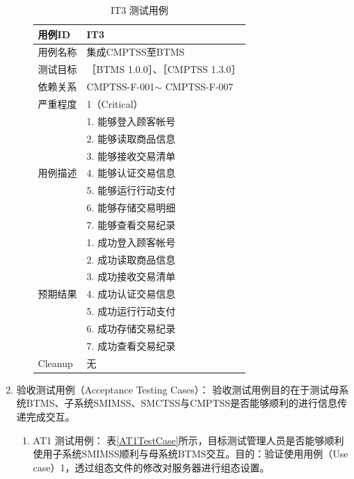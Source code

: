 \begin{enumerate}
\begin{enumerate}
						\begin{table}[!htbp]
						\caption{IT3 测试用例} %
						\centering %
						\label{IT3TestCase} %
						\begin{tabular}{|l|l|}
						\hline
						用例ID & IT3 \\ \hline
						用例名称 & 集成CMPTSS至BTMS \\ \hline
						测试目标 & {［}BTMS 1.0.0{］}、{［}CMPTSS 1.3.0{］} \\ \hline
						依赖关系 & CMPTSS-F-001$\sim$ CMPTSS-F-007 \\ \hline
						严重程度 & 1（Critical） \\ \hline
						\multirow{7}{*}{用例描述} & 1.     能够登入顾客帐号 \\ \cline{2-2} 
						 & 2.     能够读取商品信息 \\ \cline{2-2} 
						 & 3.     能够接收交易清单 \\ \cline{2-2} 
						 & 4.     能够认证交易信息 \\ \cline{2-2} 
						 & 5.     能够运行行动支付 \\ \cline{2-2} 
						 & 6.     能够存储交易明细 \\ \cline{2-2} 
						 & 7.     能够查看交易纪录 \\ \hline
						\multirow{7}{*}{预期结果} & 1.     成功登入顾客帐号 \\ \cline{2-2} 
						 & 2.     成功读取商品信息 \\ \cline{2-2} 
						 & 3.     成功接收交易清单 \\ \cline{2-2} 
						 & 4.     成功认证交易信息 \\ \cline{2-2} 
						 & 5.     成功运行行动支付 \\ \cline{2-2} 
						 & 6.     成功存储交易纪录 \\ \cline{2-2} 
						 & 7.     成功查看交易纪录 \\ \hline
						Cleanup & 无 \\ \hline
						\end{tabular}
						\end{table}
				\end{enumerate}

		\item 验收测试用例（Acceptance Testing Cases）：
			验收测试用例目的在于测试母系统BTMS、子系统SMIMSS、SMCTSS与CMPTSS是否能够顺利的进行信息传递完成交互。

			\begin{enumerate}
				\item AT1 测试用例：
					表\ref{AT1TestCase}所示，目标测试管理人员是否能够顺利使用子系统SMIMSS顺利与母系统BTMS交互。目的：验证使用用例（Use case）1，透过组态文件的修改对服务器进行组态设置。


\end{enumerate}
\end{enumerate}
